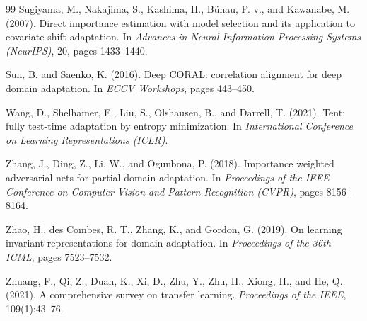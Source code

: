 \documentclass[11pt]{article}
\begin{document}
\begin{thebibliography}{99}
Sugiyama, M., Nakajima, S., Kashima, H., Bünau, P. v., and Kawanabe, M. (2007).
Direct importance estimation with model selection and its application to covariate shift adaptation.
In \textit{Advances in Neural Information Processing Systems (NeurIPS)}, 20, pages 1433--1440.

Sun, B. and Saenko, K. (2016).
Deep CORAL: correlation alignment for deep domain adaptation.
In \textit{ECCV Workshops}, pages 443--450.

Wang, D., Shelhamer, E., Liu, S., Olshausen, B., and Darrell, T. (2021).
Tent: fully test-time adaptation by entropy minimization.
In \textit{International Conference on Learning Representations (ICLR)}.

Zhang, J., Ding, Z., Li, W., and Ogunbona, P. (2018).
Importance weighted adversarial nets for partial domain adaptation.
In \textit{Proceedings of the IEEE Conference on Computer Vision and Pattern Recognition (CVPR)}, pages
8156--8164.

Zhao, H., des Combes, R. T., Zhang, K., and Gordon, G. (2019).
On learning invariant representations for domain adaptation.
In \textit{Proceedings of the 36th ICML}, pages 7523--7532.

Zhuang, F., Qi, Z., Duan, K., Xi, D., Zhu, Y., Zhu, H., Xiong, H., and He, Q. (2021).
A comprehensive survey on transfer learning.
\textit{Proceedings of the IEEE}, 109(1):43--76.

\end{thebibliography}
\end{document}
